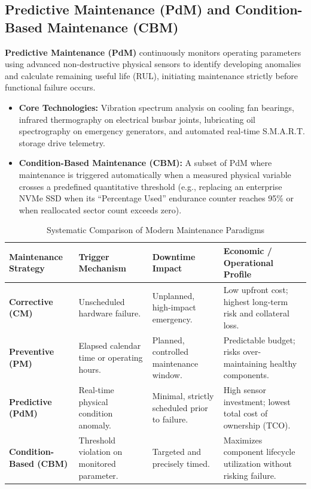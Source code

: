\subsection{Predictive Maintenance (PdM) and Condition-Based Maintenance (CBM)}
\textbf{Predictive Maintenance (PdM)} continuously monitors operating parameters using advanced non-destructive physical sensors to identify developing anomalies and calculate remaining useful life (RUL), initiating maintenance strictly before functional failure occurs.
\begin{itemize}[leftmargin=*]
    \item \textbf{Core Technologies:} Vibration spectrum analysis on cooling fan bearings, infrared thermography on electrical busbar joints, lubricating oil spectrography on emergency generators, and automated real-time S.M.A.R.T. storage drive telemetry.
    \item \textbf{Condition-Based Maintenance (CBM):} A subset of PdM where maintenance is triggered automatically when a measured physical variable crosses a predefined quantitative threshold (e.g., replacing an enterprise NVMe SSD when its ``Percentage Used'' endurance counter reaches 95\% or when reallocated sector count exceeds zero).
\end{itemize}

\begin{table}[H]
\centering
\small
{}
\begin{tabularx}{\linewidth}{l X X X}
\toprule
\rowcolor{tableheadercolor}
\textbf{Maintenance Strategy} & \textbf{Trigger Mechanism} & \textbf{Downtime Impact} & \textbf{Economic / Operational Profile} \\
\midrule
\textbf{Corrective (CM)} & Unscheduled hardware failure. & Unplanned, high-impact emergency. & Low upfront cost; highest long-term risk and collateral loss. \\
\textbf{Preventive (PM)} & Elapsed calendar time or operating hours. & Planned, controlled maintenance window. & Predictable budget; risks over-maintaining healthy components. \\
\textbf{Predictive (PdM)} & Real-time physical condition anomaly. & Minimal, strictly scheduled prior to failure. & High sensor investment; lowest total cost of ownership (TCO). \\
\textbf{Condition-Based (CBM)} & Threshold violation on monitored parameter. & Targeted and precisely timed. & Maximizes component lifecycle utilization without risking failure. \\
\bottomrule
\end{tabularx}
\caption{Systematic Comparison of Modern Maintenance Paradigms}
\end{table}

